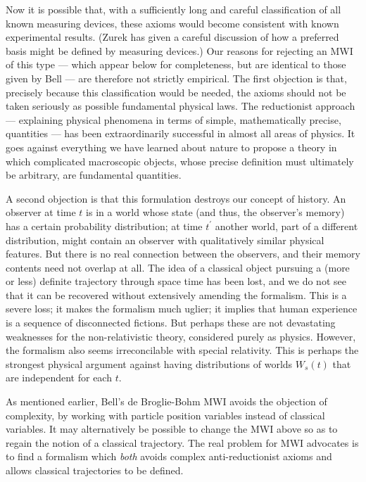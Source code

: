 \documentclass[aps,pra,12pt]{revtex4}
\begin{document}
Now it is possible that, with a sufficiently long and careful classification
of all known measuring devices, these axioms would become consistent
with known experimental results. 
(Zurek \cite{zurek} has given a careful discussion of how a preferred basis
might be defined by measuring devices.)
Our reasons for rejecting an MWI of this type --- which appear below for
completeness, but are identical to those
given by Bell \cite{bell1,bell2} --- are therefore not strictly
empirical.   
The first objection is that, 
precisely because this classification would be needed, the axioms 
should not be taken seriously as possible fundamental physical laws. 
The reductionist approach --- explaining physical phenomena in terms of 
simple, mathematically precise, quantities --- has been extraordinarily
successful in almost all areas of physics.  
It goes against everything we have learned about nature to propose a theory
in which complicated macroscopic objects, whose precise definition must 
ultimately be arbitrary, are fundamental quantities. 

A second objection is that this formulation
destroys our concept of history.  
An observer at time $t$ is in a world whose state (and thus, the observer's
memory) has a certain probability distribution; at time $t^{\prime}$ 
another world, part of a different distribution, might contain an observer with
qualitatively similar physical features.  
But there is no real connection between the observers, and their memory 
contents
need not overlap at all. 
The idea of a classical object pursuing a (more or less) definite trajectory
through space time has been lost, and we do not see that it can be recovered
without extensively amending the formalism. 
This is a severe loss; it makes the formalism much uglier; it implies
that human experience is a sequence of disconnected fictions.
But perhaps these are not devastating weaknesses for the non-relativistic 
theory, considered purely as physics. 
However, the formalism also seems irreconcilable with special relativity.
This is perhaps the strongest physical argument against having
distributions of worlds $W_s (t)$ that are independent for each $t$. 

As mentioned earlier, Bell's de Broglie-Bohm MWI avoids the objection
of complexity, by working with particle position variables instead
of classical variables. It may alternatively be possible to change the
MWI above so as to regain the notion of a classical trajectory.
The real problem for MWI advocates is to find a formalism which {\em both} 
avoids complex anti-reductionist axioms and allows classical trajectories
to be defined. 
\end{document}
